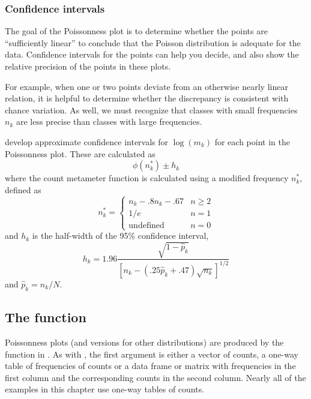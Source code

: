 \documentclass[11pt]{book}
\begin{document}
\subsubsection{Confidence intervals}
The goal of the Poissonness plot is to determine whether the points
are ``sufficiently linear'' to conclude that the Poisson distribution
is adequate for the data. Confidence intervals for the points can help
you decide, and also show the relative precision of the points in these
plots.

For example, when one or two points deviate from an otherwise nearly linear
relation,
it is helpful to determine whether the discrepancy is consistent with
chance variation.
As well, we must recognize that classes with small frequencies $n_k$
are less precise than classes with large frequencies.

\citet{HoaglinTukey:85} develop approximate confidence intervals
for $\log (m_k)$ for each point in the Poissonness plot.
These are calculated as
\begin{equation}\label{eq:poisCI}
\phi \left( n_k^{*}\right) \pm h_k
\end{equation}
where the count metameter function is calculated using a modified frequency $%
n_k^{*}$, defined as
\begin{equation*}
n_k^{*}= \left\{
\begin{array}{ll}
n_k-.8n_k-.67 & n\geq 2 \\
1/e & n=1 \\
\textrm{undefined} & n=0
\end{array}
\right.
\end{equation*}
%
and $h_k$ is the half-width of the 95\% confidence interval,
\begin{equation*}
h_k=1.96\frac{\sqrt{1-\widehat{p}_k}}{[n_k-(.25\widehat{p}_k+.47)\sqrt{n_k}%
]^{1/2}}
\end{equation*}
and $\hat{p}_k = n_k / N$.


\subsection[The distplot function]{The  function}
Poissonness plots (and versions for other distributions)
are produced by the function  in .
As with , the first argument is
either a vector of counts, a one-way table of frequencies of counts or a data frame or matrix with frequencies in the first column and the corresponding counts in the second column. Nearly all of the examples in this chapter use one-way tables of counts.
\end{document}

